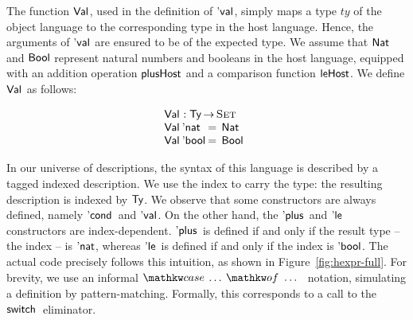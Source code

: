The function $\Val{\!}$, used in the definition of $\Eval{\!}$, simply
maps a type $ty$ of the object language to the corresponding type in
the host language. Hence, the arguments of $\Eval{\!}$ are ensured to
be of the expected type. We assume that $\Nat$ and $\Bool$ represent
natural numbers and booleans in the host language, equipped with an
addition operation $\F{plusHost}$ and a comparison function
$\F{leHost}$. We define $\Val{\!}$ as follows:

\[\stk{
\Val{\!} : \Ty \To \Set \\
\begin{array}{@{}l@{\:=\:\:}l}
\Val{\Enat}   & \Nat \\
\Val{\Ebool}  & \Bool
\end{array}
}\]

In our universe of descriptions, the syntax of this language is
described by a tagged indexed description. We use the index to carry
the type: the resulting description is indexed by $\Ty$. We observe
that some constructors are always defined, namely $\Econd{\!}{\!}{\!}$
and $\Eval{\!}$. On the other hand, the $\Eplus{\!}{\!}$ and
$\Ele{\!}{\!}$ constructors are index-dependent. $\Eplus{\!}{\!}$ is
defined if and only if the result type -- the index -- is $\Enat$,
whereas $\Ele{\!}{\!}$ is defined if and only if the index is
$\Ebool$. The actual code precisely follows this intuition, as shown
in Figure~\ref{fig:hexpr-full}. For brevity, we use an informal
$\case{\ldots}{\ldots}$ notation, simulating a definition by
pattern-matching. Formally, this corresponds to a call to the
$\switch{\!}{\!}{\!}{\!}$ eliminator.


